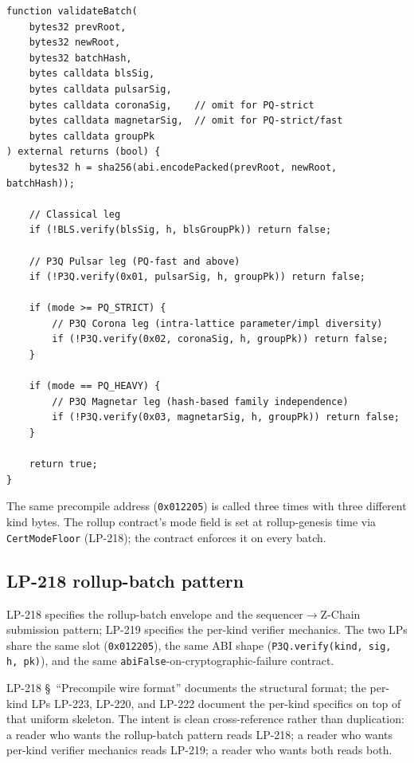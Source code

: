 \begin{lstlisting}[language={}]
function validateBatch(
    bytes32 prevRoot,
    bytes32 newRoot,
    bytes32 batchHash,
    bytes calldata blsSig,
    bytes calldata pulsarSig,
    bytes calldata coronaSig,    // omit for PQ-strict
    bytes calldata magnetarSig,  // omit for PQ-strict/fast
    bytes calldata groupPk
) external returns (bool) {
    bytes32 h = sha256(abi.encodePacked(prevRoot, newRoot, batchHash));

    // Classical leg
    if (!BLS.verify(blsSig, h, blsGroupPk)) return false;

    // P3Q Pulsar leg (PQ-fast and above)
    if (!P3Q.verify(0x01, pulsarSig, h, groupPk)) return false;

    if (mode >= PQ_STRICT) {
        // P3Q Corona leg (intra-lattice parameter/impl diversity)
        if (!P3Q.verify(0x02, coronaSig, h, groupPk)) return false;
    }

    if (mode == PQ_HEAVY) {
        // P3Q Magnetar leg (hash-based family independence)
        if (!P3Q.verify(0x03, magnetarSig, h, groupPk)) return false;
    }

    return true;
}
\end{lstlisting}

The same precompile address (\texttt{0x012205}) is called
three times with three different kind bytes. The rollup
contract's mode field is set at rollup-genesis time via
\texttt{CertModeFloor} (LP-218); the contract enforces it on
every batch.

\subsection{LP-218 rollup-batch pattern}

LP-218 specifies the rollup-batch envelope and the
sequencer$\to$Z-Chain submission pattern; LP-219 specifies the
per-kind verifier mechanics. The two LPs share the same slot
(\texttt{0x012205}), the same ABI shape
(\texttt{P3Q.verify(kind, sig, h, pk)}), and the same
\texttt{abiFalse}-on-cryptographic-failure contract.

LP-218 \S~``Precompile wire format'' documents the structural
format; the per-kind LPs LP-223, LP-220, and LP-222
document the per-kind specifics on top of that uniform skeleton.
The intent is clean cross-reference rather than duplication: a
reader who wants the rollup-batch pattern reads LP-218; a reader
who wants per-kind verifier mechanics reads LP-219; a reader who
wants both reads both.

